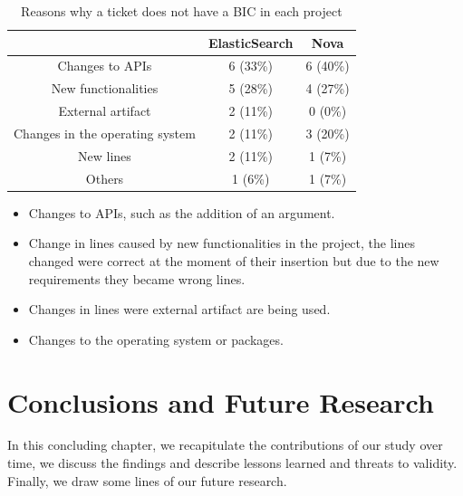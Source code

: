 \documentclass[a4paper, 12pt]{book}
\begin{document}
\begin{table}[!t]
\renewcommand{\arraystretch}{1.3}
\caption{ Reasons why a ticket does not have a BIC in each project}
\label{tablereasosNoBIC}
\centering
\begin{tabular}{|c||c||c| }
\hline
  & ElasticSearch & Nova  \\
\hline
Changes to APIs & 6 (33\%) & 6 (40\%) \\
\hline
New functionalities & 5 (28\%) & 4 (27\%)\\
\hline
External artifact & 2 (11\%) & 0 (0\%)\\
\hline
Changes in the operating system & 2 (11\%) & 3 (20\%)\\
\hline
New lines & 2 (11\%) & 1 (7\%)\\
\hline
Others & 1 (6\%) & 1 (7\%) \\
\hline
\end{tabular}
\end{table}

\begin{itemize}
  \item Changes to APIs, such as the addition of an argument.
  \item Change in lines caused by new functionalities in the project, the lines changed were correct at the moment of their insertion but due to the new requirements they became wrong lines.
  \item Changes in lines were external artifact are being used.
  \item Changes to the operating system or packages.
\end{itemize}



\cleardoublepage
\chapter{Conclusions and Future Research}
\label{chap:conclusions}
In this concluding chapter, we recapitulate the contributions of our study over time, we discuss the findings and describe lessons learned and threats to validity. Finally, we draw some lines of our future research.
\end{document}
